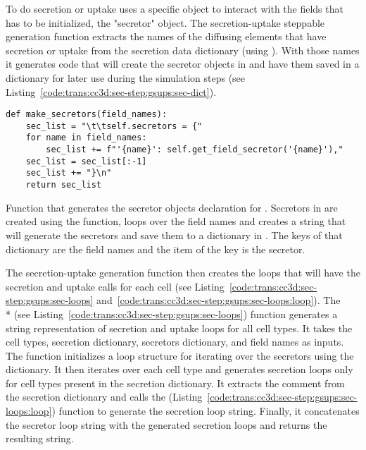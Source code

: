 To do secretion or uptake \ccds uses a specific object to interact with the fields that has to be initialized, the "secretor" object. The secretion-uptake steppable generation function extracts the names of the diffusing elements that have secretion or uptake from the secretion data dictionary (using ). With those names it generates \ccds code that will create the secretor objects in \ccds and have them saved in a dictionary for later use during the simulation steps (see Listing~\ref{code:trans:cc3d:sec-step:gsups:sec-dict}). 
\begin{listing}[H]%
\begin{verbatim}
def make_secretors(field_names):
    sec_list = "\t\tself.secretors = {"
    for name in field_names:
        sec_list += f"'{name}': self.get_field_secretor('{name}'),"
    sec_list = sec_list[:-1]
    sec_list += "}\n"
    return sec_list
\end{verbatim}
\caption{Function that generates the secretor objects declaration for \ccd. Secretors in \ccds are created using the  function,  loops over the field names and creates a string that will generate the secretors and save them to a dictionary in \ccd. The keys of that dictionary are the field names and the item of the key is the secretor.}\label{code:trans:cc3d:sec-step:gsups:sec-dict}
\end{listing}

The secretion-uptake generation function then creates the \ccds loops that will have the secretion and uptake calls for each cell (see Listing~\ref{code:trans:cc3d:sec-step:gsups:sec-loops} and~\ref{code:trans:cc3d:sec-step:gsups:sec-loops:loop}). The\\* (see Listing~\ref{code:trans:cc3d:sec-step:gsups:sec-loops}) function generates a string representation of secretion and uptake loops for all cell types. It takes the cell types, secretion dictionary, secretors dictionary, and field names as inputs. The function initializes a loop structure for iterating over the secretors using the  dictionary. It then iterates over each cell type and generates secretion loops only for cell types present in the secretion dictionary. It extracts the comment from the secretion dictionary and calls the  (Listing~\ref{code:trans:cc3d:sec-step:gsups:sec-loops:loop}) function to generate the secretion loop string. Finally, it concatenates the secretor loop string with the generated secretion loops and returns the resulting string.

